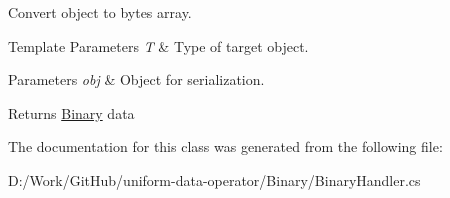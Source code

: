 Convert object to bytes array. 


\begin{DoxyTemplParams}{Template Parameters}
{\em T} & Type of target object.\\
\hline
\end{DoxyTemplParams}

\begin{DoxyParams}{Parameters}
{\em obj} & Object for serialization.\\
\hline
\end{DoxyParams}
\begin{DoxyReturn}{Returns}
\mbox{\hyperlink{namespace_uniform_data_operator_1_1_binary}{Binary}} data
\end{DoxyReturn}


The documentation for this class was generated from the following file\+:\begin{DoxyCompactItemize}
\item 
D\+:/\+Work/\+Git\+Hub/uniform-\/data-\/operator/\+Binary/Binary\+Handler.\+cs\end{DoxyCompactItemize}
